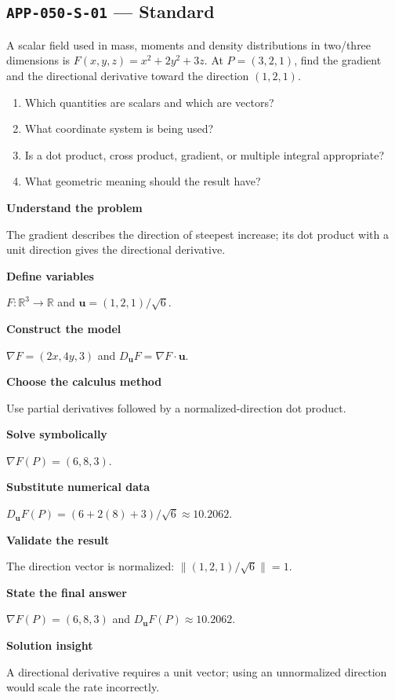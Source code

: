 \documentclass[11pt]{book}
\newcommand{\pid}[1]{\texttt{#1}}
\begin{document}
\subsection*{\pid{APP-050-S-01} — Standard}
\begin{problembox}
A scalar field used in mass, moments and density distributions in two/three dimensions is $F(x,y,z)=x^2+2y^2+3z$. At $P=(3,2,1)$, find the gradient and the directional derivative toward the direction $(1,2,1)$.
\end{problembox}
\begin{promptbox}\begin{enumerate}
\item Which quantities are scalars and which are vectors?
\item What coordinate system is being used?
\item Is a dot product, cross product, gradient, or multiple integral appropriate?
\item What geometric meaning should the result have?
\end{enumerate}\end{promptbox}
\begin{solutionbox}
\textbf{Understand the problem}\par The gradient describes the direction of steepest increase; its dot product with a unit direction gives the directional derivative.\par\medskip
\textbf{Define variables}\par $F:\mathbb R^3\to\mathbb R$ and $\mathbf u=(1,2,1)/\sqrt6$.\par\medskip
\textbf{Construct the model}\par $\nabla F=(2x,4y,3)$ and $D_{\mathbf u}F=\nabla F\cdot\mathbf u$.\par\medskip
\textbf{Choose the calculus method}\par Use partial derivatives followed by a normalized-direction dot product.\par\medskip
\textbf{Solve symbolically}\par $\nabla F(P)=(6,8,3)$.\par\medskip
\textbf{Substitute numerical data}\par $D_{\mathbf u}F(P)=(6+2(8)+3)/\sqrt6\approx 10.2062$.\par\medskip
\textbf{Validate the result}\par The direction vector is normalized: $\|(1,2,1)/\sqrt6\|=1$.\par\medskip
\textbf{State the final answer}\par $\nabla F(P)=(6,8,3)$ and $D_{\mathbf u}F(P)\approx 10.2062$.\par\medskip
\textbf{Solution insight}\par A directional derivative requires a unit vector; using an unnormalized direction would scale the rate incorrectly.\par\medskip
\end{solutionbox}
\end{document}

